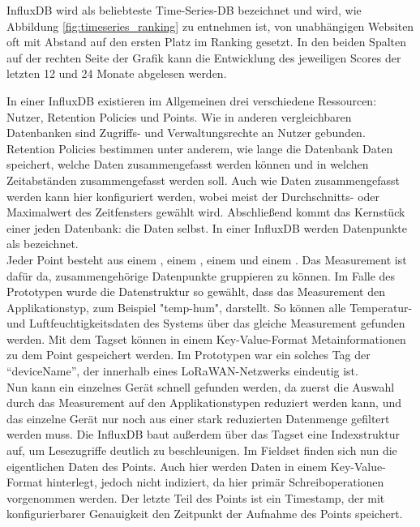 InfluxDB wird als beliebteste Time-Series-DB bezeichnet und wird, wie Abbildung \ref{fig:timeseries_ranking} zu entnehmen ist, von unabhängigen Websiten oft mit Abstand auf den ersten Platz im Ranking gesetzt. In den beiden Spalten auf der rechten Seite der Grafik kann die Entwicklung des jeweiligen Scores der letzten 12 und 24 Monate abgelesen werden.

In einer InfluxDB existieren im Allgemeinen drei verschiedene Ressourcen: Nutzer, Retention Policies und Points. Wie in anderen vergleichbaren Datenbanken sind Zugriffs- und Verwaltungsrechte an Nutzer gebunden. Retention Policies bestimmen unter anderem, wie lange die Datenbank Daten speichert, welche Daten zusammengefasst werden können und in welchen Zeitabständen zusammengefasst werden soll. Auch wie Daten zusammengefasst werden kann hier konfiguriert werden, wobei meist der Durchschnitts- oder Maximalwert des Zeitfensters gewählt wird. Abschließend kommt das Kernstück einer jeden Datenbank: die Daten selbst. In einer InfluxDB werden Datenpunkte als  bezeichnet.\\
Jeder Point besteht aus einem , einem , einem  und einem . Das Measurement ist dafür da, zusammengehörige Datenpunkte gruppieren zu können. Im Falle des Prototypen wurde die Datenstruktur so gewählt, dass das Measurement den Applikationstyp, zum Beispiel "temp-hum", darstellt. So können alle Temperatur- und Luftfeuchtigkeitsdaten des Systems über das gleiche Measurement gefunden werden. Mit dem Tagset können in einem Key-Value-Format Metainformationen zu dem Point gespeichert werden. Im Prototypen war ein solches Tag der ``deviceName'', der innerhalb eines LoRaWAN-Netzwerks eindeutig ist.\\
Nun kann ein einzelnes Gerät schnell gefunden werden, da zuerst die Auswahl durch das Measurement auf den Applikationstypen reduziert werden kann, und das einzelne Gerät nur noch aus einer stark reduzierten Datenmenge gefiltert werden muss. Die InfluxDB baut außerdem über das Tagset eine Indexstruktur auf, um Lesezugriffe deutlich zu beschleunigen. Im Fieldset finden sich nun die eigentlichen Daten des Points. Auch hier werden Daten in einem Key-Value-Format hinterlegt, jedoch nicht indiziert, da hier primär Schreiboperationen vorgenommen werden. Der letzte Teil des Points ist ein Timestamp, der mit konfigurierbarer Genauigkeit den Zeitpunkt der Aufnahme des Points speichert. 

